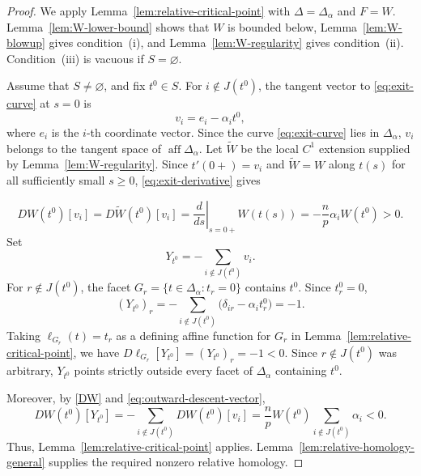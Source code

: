 \documentclass[12pt,reqno]{amsart}
\numberwithin{equation}{section}
\theoremstyle{remark}
\begin{document}
\begin{proof}


We apply Lemma~\ref{lem:relative-critical-point} with
\(\Delta=\Delta_\alpha\) and \(F=W\).
Lemma~\ref{lem:W-lower-bound} shows that \(W\) is bounded below,
Lemma~\ref{lem:W-blowup} gives condition~\textup{(i)}, and
Lemma~\ref{lem:W-regularity} gives condition~\textup{(ii)}.
Condition~\textup{(iii)} is vacuous if \(S=\varnothing\). 

Assume
that \(S\neq\varnothing\), and fix \(t^0\in S\).  For \(i\notin J(t^0)\), the tangent vector to \eqref{eq:exit-curve} at $s=0$ is
\begin{equation}\label{eq:exit-tangent-vector}
	v_i=e_i-\alpha_i t^0,
\end{equation}
where \(e_i\) is the \(i\)-th coordinate vector. 
Since the curve \eqref{eq:exit-curve} lies in
\(\Delta_\alpha\),  \(v_i\) belongs to the
tangent space of \(\operatorname{aff}\Delta_\alpha\). Let \(\widetilde W\) be the local \(C^1\) extension supplied by
Lemma~\ref{lem:W-regularity}. Since \(t'(0+)=v_i\) and
\(\widetilde W=W\) along \(t(s)\) for all sufficiently small
\(s\geq0\),  \eqref{eq:exit-derivative} gives

\begin{equation}\label{DW}
	DW(t^0)[v_i]
	=
	D\widetilde W(t^0)[v_i]
	=
	\left.\frac{d}{ds}\right|_{s=0+}W(t(s))
	=
	-\frac np\alpha_iW(t^0)
	>
	0.
\end{equation}
Set
\begin{equation}\label{eq:outward-descent-vector}
	Y_{t^0}
	=
	-\sum_{i\notin J(t^0)}v_i.
\end{equation}
For \(r\notin J(t^0)\), the facet
\(
G_r=\{t\in\Delta_\alpha:t_r=0\}
\)
contains \(t^0\). Since \(t_r^0=0\),
\[
(Y_{t^0})_r
=
-\sum_{i\notin J(t^0)}
\bigl(\delta_{ir}-\alpha_i t_r^0\bigr)
=
-1.
\]
Taking \(\ell_{G_r}(t)=t_r\) as a defining affine function for
\(G_r\) in Lemma~\ref{lem:relative-critical-point}, we have
\(D\ell_{G_r}[Y_{t^0}]=(Y_{t^0})_r=-1<0\).
Since \(r\notin J(t^0)\) was arbitrary, \(Y_{t^0}\) points strictly
outside every facet of \(\Delta_\alpha\) containing \(t^0\).

Moreover, by \eqref{DW} and
\eqref{eq:outward-descent-vector},
\[
DW(t^0)[Y_{t^0}]
=
-\sum_{i\notin J(t^0)}DW(t^0)[v_i]
=
\frac np W(t^0)\sum_{i\notin J(t^0)}\alpha_i
<0.
\]
Thus, Lemma~\ref{lem:relative-critical-point} applies. Lemma~\ref{lem:relative-homology-general} supplies the required nonzero relative homology.
\end{proof}
\end{document}
